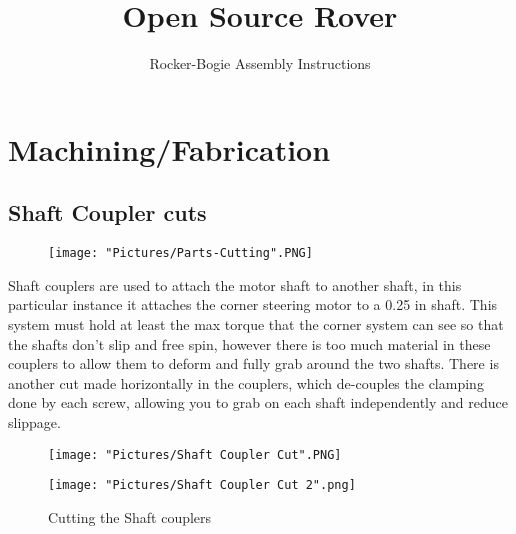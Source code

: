 \documentclass[12pt]{article}
\begin{document}
\title{Open Source Rover}
\author{Rocker-Bogie Assembly Instructions}

\makeatletter         
\def\@maketitle{
\begin{center}	
	\makebox[\textwidth][c]{ \texttt{[image: "Pictures/Corner Title".png]}}
	{\Huge \bfseries \sffamily \@title }\\[4ex] 
	{\huge \bfseries \sffamily \@author}\\[4ex] 
	\texttt{[image: "Pictures/JPL logo".png]}
\end{center}}
\makeatother

\maketitle


\newpage

\tableofcontents

\section{Machining/Fabrication}
\subsection{Shaft Coupler cuts}

\begin{figure}[H]
	\centering
	\texttt{[image: "Pictures/Parts-Cutting".PNG]}
\end{figure}

Shaft couplers are used to attach the motor shaft to another shaft, in this particular instance it attaches the corner steering motor to a 0.25 in shaft. This system must hold at least the max torque that the corner system can see so that the shafts don't slip and free spin, however there is too much material in these couplers to allow them to deform and fully grab around the two shafts. There is another cut made horizontally in the couplers, which de-couples the clamping done by each screw, allowing you to grab on each shaft independently and reduce slippage. 


\begin{figure}[H]
  	\centering
  	\begin{minipage}[b]{0.35\textwidth}
   		 \texttt{[image: "Pictures/Shaft Coupler Cut".PNG]}		
	\end{minipage}
 	 \hfill
 	 \begin{minipage}[b]{0.55\textwidth}
  		  \texttt{[image: "Pictures/Shaft Coupler Cut 2".png]}
  	\end{minipage}
 	 \caption{Cutting the Shaft couplers}
	\label{Shaft coupler cut}
\end{figure}
\end{document}
